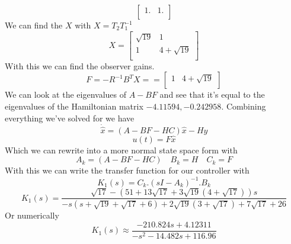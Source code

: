 \documentclass{article}
\begin{document}
\begin{enumerate}[(a)]
$$\begin{bmatrix}
1. & 1. \\
\end{bmatrix}
$$
We can find the $X$ with $ X = T_2T_1^{-1} $
$$
X =
\begin{bmatrix}
\sqrt{19} & 1 \\
1 & 4+\sqrt{19} \\
\end{bmatrix}
$$
With this we can find the observer gains.
$$ F = -R^{-1}B^TX =
=
\begin{bmatrix}
1 & 4+\sqrt{19} \\
\end{bmatrix}
$$
We can look at the eigenvalues of $A-BF$ and see that it's equal to the eigenvalues of the Hamiltonian matrix $-4.11594, -0.242958$.
\newline
Combining everything we've solved for we have
$$ \dot{\hat{x}} = (A - BF - HC)\hat{x} -Hy $$
$$ u(t) = F\hat{x} $$
Which we can rewrite into a more normal state space form with
$$
A_k = (A-BF-HC)
\quad
B_k = H
\quad
C_k = F
$$
With this we can write the transfer function for our controller with
$$ K_1(s) = C_k.(s I- A_k)^{-1}.B_k $$
$$ K_1(s) = \frac{\sqrt{17}-\left(51+13 \sqrt{17}+3 \sqrt{19} \left(4+\sqrt{17}\right)\right) s}{-s\left(s+\sqrt{19}+\sqrt{17}+6\right)+2 \sqrt{19} \left(3+\sqrt{17}\right)+7 \sqrt{17}+26}$$
Or numerically
$$ K_1(s) \approx \frac{- 210.824 s + 4.12311 }{-s^2-14.482 s+116.96} $$


\end{enumerate}
\end{document}

